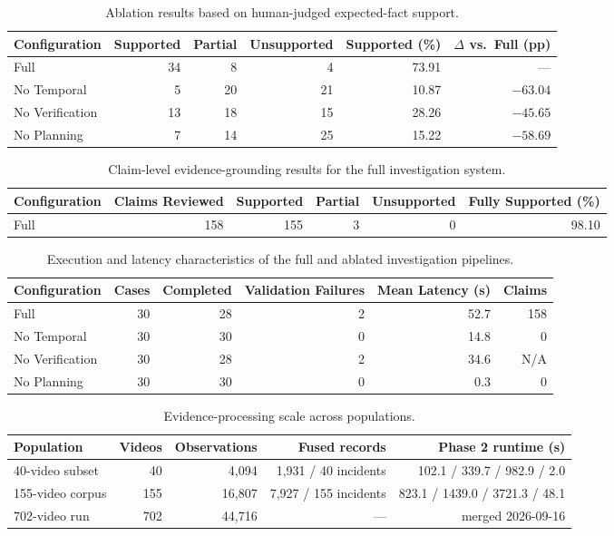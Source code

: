 \begin{table}[!t]
\centering
\caption{Ablation results based on human-judged expected-fact support.}
\label{tab:ablation-v2}
\begin{tabular}{lrrrrr}
\toprule
Configuration & Supported & Partial & Unsupported & Supported (\%) & $\Delta$ vs.\ Full (pp) \\
\midrule
Full & 34 & 8 & 4 & 73.91 & --- \\
No Temporal & 5 & 20 & 21 & 10.87 & $-63.04$ \\
No Verification & 13 & 18 & 15 & 28.26 & $-45.65$ \\
No Planning & 7 & 14 & 25 & 15.22 & $-58.69$ \\
\bottomrule
\end{tabular}
\end{table}

\begin{table}[!t]
\centering
\caption{Claim-level evidence-grounding results for the full investigation system.}
\label{tab:claim-grounding-v2}
\begin{tabular}{lrrrrr}
\toprule
Configuration & Claims Reviewed & Supported & Partial & Unsupported & Fully Supported (\%) \\
\midrule
Full & 158 & 155 & 3 & 0 & 98.10 \\
\bottomrule
\end{tabular}
\end{table}

\begin{table}[!t]
\centering
\caption{Execution and latency characteristics of the full and ablated investigation pipelines.}
\label{tab:runtime-v2}
\begin{tabular}{lrrrrr}
\toprule
Configuration & Cases & Completed & Validation Failures & Mean Latency (s) & Claims \\
\midrule
Full & 30 & 28 & 2 & 52.7 & 158 \\
No Temporal & 30 & 30 & 0 & 14.8 & 0 \\
No Verification & 30 & 28 & 2 & 34.6 & N/A \\
No Planning & 30 & 30 & 0 & 0.3 & 0 \\
\bottomrule
\end{tabular}
\end{table}

\begin{table}[!t]
\centering
\caption{Evidence-processing scale across populations.}
\label{tab:scale}
\begin{tabular}{lrrrr}
\toprule
Population & Videos & Observations & Fused records & Phase 2 runtime (s) \\
\midrule
40-video subset & 40 & 4,094 & 1,931 / 40 incidents & 102.1 / 339.7 / 982.9 / 2.0 \\
155-video corpus & 155 & 16,807 & 7,927 / 155 incidents & 823.1 / 1439.0 / 3721.3 / 48.1 \\
702-video run & 702 & 44,716 & --- & merged 2026-09-16 \\
\bottomrule
\end{tabular}
\end{table}
